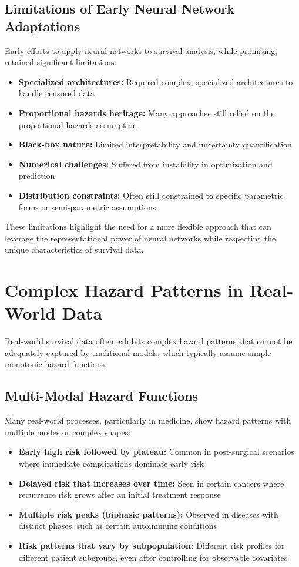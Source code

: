 \subsection{Limitations of Early Neural Network Adaptations}

Early efforts to apply neural networks to survival analysis, while promising, retained significant limitations:

\begin{itemize}
    \item \textbf{Specialized architectures:} Required complex, specialized architectures to handle censored data
    \item \textbf{Proportional hazards heritage:} Many approaches still relied on the proportional hazards assumption
    \item \textbf{Black-box nature:} Limited interpretability and uncertainty quantification
    \item \textbf{Numerical challenges:} Suffered from instability in optimization and prediction
    \item \textbf{Distribution constraints:} Often still constrained to specific parametric forms or semi-parametric assumptions
\end{itemize}

These limitations highlight the need for a more flexible approach that can leverage the representational power of neural networks while respecting the unique characteristics of survival data.

\section{Complex Hazard Patterns in Real-World Data}

Real-world survival data often exhibits complex hazard patterns that cannot be adequately captured by traditional models, which typically assume simple monotonic hazard functions.

\subsection{Multi-Modal Hazard Functions}

Many real-world processes, particularly in medicine, show hazard patterns with multiple modes or complex shapes:

\begin{itemize}
    \item \textbf{Early high risk followed by plateau:} Common in post-surgical scenarios where immediate complications dominate early risk
    \item \textbf{Delayed risk that increases over time:} Seen in certain cancers where recurrence risk grows after an initial treatment response
    \item \textbf{Multiple risk peaks (biphasic patterns):} Observed in diseases with distinct phases, such as certain autoimmune conditions
    \item \textbf{Risk patterns that vary by subpopulation:} Different risk profiles for different patient subgroups, even after controlling for observable covariates
\end{itemize}


